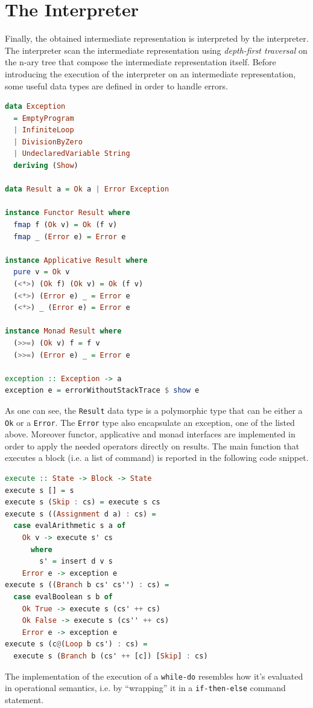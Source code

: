 \documentclass[12pt,a4paper]{article}
\begin{document}
\section*{The Interpreter}
Finally, the obtained intermediate representation is interpreted by the interpreter.
The interpreter scan the intermediate representation using \textit{depth-first traversal} on the n-ary tree that compose the intermediate representation itself.
Before introducing the execution of the interpreter on an intermediate representation, some useful data types are defined in order to handle errors.
\begin{lstlisting}[language=Haskell, style=custom-style]
data Exception
  = EmptyProgram
  | InfiniteLoop
  | DivisionByZero
  | UndeclaredVariable String
  deriving (Show)

data Result a = Ok a | Error Exception

instance Functor Result where
  fmap f (Ok v) = Ok (f v)
  fmap _ (Error e) = Error e

instance Applicative Result where
  pure v = Ok v
  (<*>) (Ok f) (Ok v) = Ok (f v)
  (<*>) (Error e) _ = Error e
  (<*>) _ (Error e) = Error e

instance Monad Result where
  (>>=) (Ok v) f = f v
  (>>=) (Error e) _ = Error e

exception :: Exception -> a
exception e = errorWithoutStackTrace $ show e
\end{lstlisting}
As one can see, the \texttt{Result} data type is a polymorphic type that can be either a \texttt{Ok} or a \texttt{Error}.
The \texttt{Error} type also encapsulate an exception, one of the listed above.
Moreover functor, applicative and monad interfaces are implemented in order to apply the needed operators directly on results.
The main function that executes a block (i.e. a list of command) is reported in the following code snippet.
\begin{lstlisting}[language=Haskell, style=custom-style]
execute :: State -> Block -> State
execute s [] = s
execute s (Skip : cs) = execute s cs
execute s ((Assignment d a) : cs) =
  case evalArithmetic s a of
    Ok v -> execute s' cs
      where
        s' = insert d v s
    Error e -> exception e
execute s ((Branch b cs' cs'') : cs) =
  case evalBoolean s b of
    Ok True -> execute s (cs' ++ cs)
    Ok False -> execute s (cs'' ++ cs)
    Error e -> exception e
execute s (c@(Loop b cs') : cs) =
  execute s (Branch b (cs' ++ [c]) [Skip] : cs)
\end{lstlisting}
The implementation of the execution of a \texttt{while-do} resembles how it's evaluated in operational semantics, i.e. by ``wrapping'' it in a \texttt{if-then-else} command statement.
\end{document}
